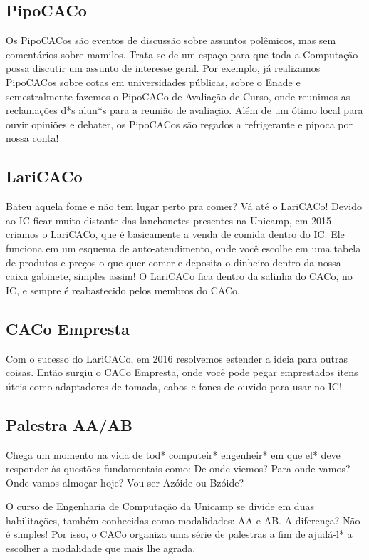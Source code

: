 \subsection{PipoCACo}

Os PipoCACos são eventos de discussão sobre assuntos polêmicos, mas sem
comentários sobre mamilos. Trata-se de um espaço para que toda a Computação
possa discutir um assunto de interesse geral. Por exemplo, já realizamos
PipoCACos sobre cotas em universidades públicas, sobre o Enade e semestralmente
fazemos o PipoCACo de Avaliação de Curso, onde reunimos as reclamações d*s
alun*s para a reunião de avaliação. Além de um ótimo local para ouvir opiniões e
debater, os PipoCACos são regados a refrigerante e pipoca por nossa conta!

\subsection{LariCACo}

Bateu aquela fome e não tem lugar perto pra comer? Vá até o LariCACo!  Devido ao
IC ficar muito distante das lanchonetes presentes na Unicamp, em 2015 criamos o
LariCACo, que é basicamente a venda de comida dentro do IC. Ele funciona em um
esquema de auto-atendimento, onde você escolhe em uma tabela de produtos e
preços o que quer comer e deposita o dinheiro dentro da nossa caixa gabinete,
simples assim! O LariCACo fica dentro da salinha do CACo, no IC, e sempre é
reabastecido pelos membros do CACo.

\subsection{CACo Empresta}

Com o sucesso do LariCACo, em 2016 resolvemos estender a ideia para outras
coisas. Então surgiu o CACo Empresta, onde você pode pegar emprestados itens
úteis como adaptadores de tomada, cabos e fones de ouvido para usar no IC!

\subsection{Palestra AA/AB}

Chega um momento na vida de tod* computeir* engenheir* em que el* deve responder
às questões fundamentais como: De onde viemos? Para onde vamos? Onde vamos
almoçar hoje? Vou ser Azóide ou Bzóide?

O curso de Engenharia de Computação da Unicamp se divide em duas habilitações,
também conhecidas como modalidades: AA e AB. A diferença? Não é simples! Por
isso, o CACo organiza uma série de palestras a fim de ajudá-l* a escolher a
modalidade que mais lhe agrada.


